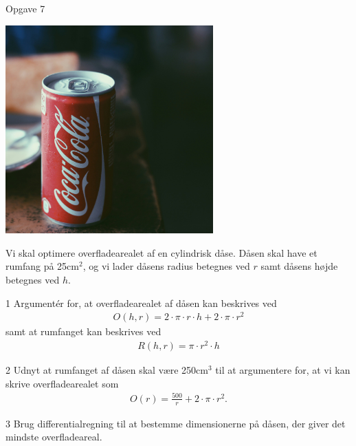 \begin{opgavetekst}{Opgave 7}
	\begin{center}
		\includegraphics[width = 0.6\textwidth]{Billeder/cola}
	\end{center}
	Vi skal optimere overfladearealet af en cylindrisk dåse. Dåsen skal have et rumfang på 25cm$^2$, og vi
	lader dåsens radius betegnes ved $r$ samt dåsens højde betegnes ved $h$.
\end{opgavetekst}
\begin{delopgave}{}{1}
	Argumentér for, at overfladearealet af dåsen kan beskrives ved 
	\begin{align*}
		O(h,r) = 2 \cdot \pi \cdot r\cdot h + 2 \cdot \pi \cdot r^2
	\end{align*}
	samt at	rumfanget kan beskrives ved 
	\begin{align*}
		R(h,r) =  \pi \cdot r^2 \cdot h
	\end{align*}
\end{delopgave}
\begin{delopgave}{}{2}
	Udnyt at rumfanget af dåsen skal være 250cm$^3$ til at argumentere for, at vi kan skrive overfladearealet 
	som
	\begin{align*}
		O(r) = \frac{500}{r} + 2\cdot \pi \cdot r^2.
	\end{align*}
\end{delopgave}
\begin{delopgave}{}{3}
	Brug differentialregning til at bestemme dimensionerne på dåsen, der giver det mindste overfladeareal. 
\end{delopgave}